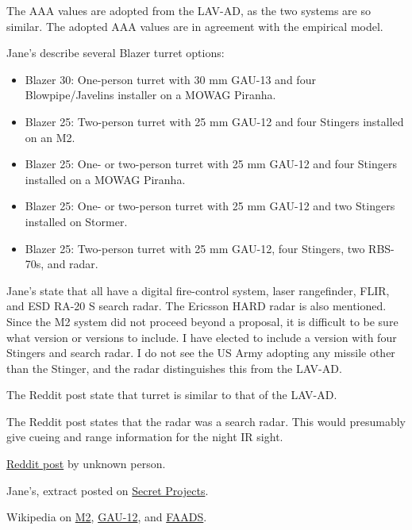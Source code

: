 \begin{withcounters}
{        

        

        The AAA values are adopted from the LAV-AD, as the two systems are so similar.
        The adopted AAA values are in agreement with the empirical model.

        Jane's describe several Blazer turret options:
        \begin{itemize}
            \item Blazer 30: One-person turret with 30 mm GAU-13 and four Blowpipe/Javelins installer on a MOWAG Piranha.
            \item Blazer 25: Two-person turret with 25 mm GAU-12 and four Stingers installed on an M2.
            \item Blazer 25: One- or two-person turret with 25 mm GAU-12 and four Stingers installed on a MOWAG Piranha.
            \item Blazer 25: One- or two-person turret with 25 mm GAU-12 and two Stingers installed on Stormer.
            \item Blazer 25: Two-person turret with  25 mm GAU-12, four Stingers, two RBS-70s, and radar.
        \end{itemize}
        Jane's state that all have a digital fire-control system, laser rangefinder, FLIR, and ESD RA-20 S search radar. The Ericsson HARD radar is also mentioned.
        Since the M2 system did not proceed beyond a proposal, it is difficult to be sure what version or versions to include. I have elected to include a version with four Stingers and search radar. I do not see the US Army adopting any missile other than the Stinger, and the radar distinguishes this from the LAV-AD.

        The Reddit post state that turret is similar to that of the LAV-AD.

        The Reddit post states that the radar was a search radar. This would presumably give cueing and range information for the night IR sight.

        \begin{notesources}
            \item \href{https://www.reddit.com/r/Warthunder/comments/bdmhij/machbet_is_for_losers_m2_bradley_with_ge_blazer/}{Reddit post} by unknown person.
            \item Jane's, extract posted on \href{https://www.secretprojects.co.uk/threads/ge-blazer-air-defence-turrets.19351/}{Secret Projects}.
            \item Wikipedia on \href{https://en.wikipedia.org/wiki/M2_Bradley}{M2}, \href{https://en.wikipedia.org/wiki/GAU-12_Equalizer}{GAU-12}, and \href{https://en.wikipedia.org/wiki/Forward_Area_Air_Defense_System}{FAADS}.
        \end{notesources}
    }


\end{withcounters}
